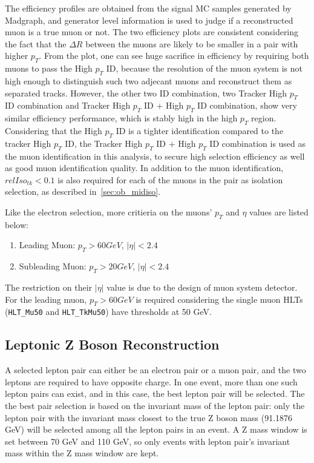 \vspace{0.3cm}
The efficiency profiles are obtained from the signal MC samples generated by Madgraph, and generator level information is used to judge if a reconstructed muon is a true muon or not. The two efficiency plots are consistent considering the fact that the $\Delta R$ between the muons are likely to be smaller in a pair with higher $p_T$. From the plot, one can see huge sacrifice in efficiency by requiring both muons to pass the High $p_T$ ID, because the resolution of the muon system is not high enough to distinguish such two adjecant muons and reconstruct them as separated tracks. However, the other two ID combination, two Tracker High $p_T$ ID combination and Tracker High $p_T$ ID $+$ High $p_T$ ID combination, show very similar efficiency performance, which is stably high in the high $p_T$ region. Considering that the High $p_T$ ID is a tighter identification compared to the tracker High $p_T$ ID, the Tracker High $p_T$ ID $+$ High $p_T$ ID combination is used as the muon identification in this analysis, to secure high selection efficiency as well as good muon identification quality. In addition to the muon identification, $relIso_{tk}<0.1$ is also required for each of the muons in the pair as isolation selection, as described in~\ref{sec:ob_midiso}.

\vspace{0.3cm}
Like the electron selection, more critieria on the muons' $p_T$ and $\eta$ values are listed below:
\begin{enumerate}
\item Leading Muon: $p_T >60 GeV$, $|\eta|<2.4$
\item Subleading Muon: $p_T >20 GeV$, $|\eta|<2.4$
\end{enumerate}

The restriction on their $|\eta|$ value is due to the design of muon system detector. For the leading muon, $p_T >60 GeV$ is required considering the single muon HLTs (\texttt{HLT\_Mu50} and \texttt{HLT\_TkMu50}) have thresholds at 50 GeV.

\subsection{Leptonic Z Boson Reconstruction}
A selected lepton pair can either be an electron pair or a muon pair, and the two leptons are required to have opposite charge. In one event, more than one such lepton pairs can exist, and in this case, the best lepton pair will be selected. The the best pair selection is based on the invariant mass of the lepton pair: only the lepton pair with the invariant mass closest to the true Z boson mass (91.1876 GeV) will be selected among all the lepton pairs in an event. A Z mass window is set between 70 GeV and 110 GeV, so only events with lepton pair's invariant mass within the Z mass window are kept.

